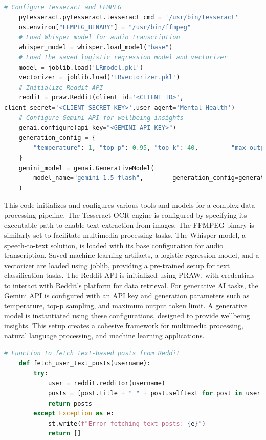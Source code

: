 \begin{tcolorbox}[colback=gray!5!white, colframe=gray!80!black, boxrule=0.5pt, title=Configuration and Model Initialization]
    \begin{lstlisting}[language=Python]
    # Configure Tesseract and FFMPEG
    pytesseract.pytesseract.tesseract_cmd = '/usr/bin/tesseract'
    os.environ["FFMPEG_BINARY"] = "/usr/bin/ffmpeg"
    # Load Whisper model for audio transcription
    whisper_model = whisper.load_model("base")
    # Load the saved logistic regression model and vectorizer
    model = joblib.load('LRmodel.pkl')
    vectorizer = joblib.load('LRvectorizer.pkl')
    # Initialize Reddit API
    reddit = praw.Reddit(client_id='<CLIENT_ID>',
client_secret='<CLIENT_SECRET_KEY>',user_agent='Mental Health')
    # Configure Gemini API for wellbeing insights
    genai.configure(api_key="<GEMINI_API_KEY>")
    generation_config = {
        "temperature": 1, "top_p": 0.95, "top_k": 40,         "max_output_tokens": 8192, "response_mime_type": "text/plain",
    }
    gemini_model = genai.GenerativeModel(
        model_name="gemini-1.5-flash",        generation_config=generation_config,
    )
    \end{lstlisting}
\end{tcolorbox}

\noindent
This code initializes and configures various tools and models for a complex data-processing pipeline. The Tesseract OCR engine is configured by specifying its executable path to enable text extraction from images. The FFMPEG binary is similarly set to facilitate multimedia processing tasks. The Whisper model, a speech-to-text solution, is loaded with its base configuration for audio transcription. Saved machine learning artifacts, a logistic regression model, and a vectorizer are loaded using joblib, providing a pre-trained setup for text classification tasks. The Reddit API is initialized using PRAW, with credentials to interact with Reddit's platform for data retrieval. For generative AI tasks, the Gemini API is configured with an API key and generation parameters such as temperature, top-p sampling, and maximum output token limit. A generative model is instantiated using these configurations, designed to provide wellbeing insights. This setup creates a cohesive framework for multimedia processing, natural language processing, and machine learning applications.


\begin{tcolorbox}[colback=gray!5!white, colframe=gray!80!black, boxrule=0.5pt, title=Fetching Reddit User Text Posts]
    \begin{lstlisting}[language=Python]
    # Function to fetch text-based posts from Reddit
    def fetch_user_text_posts(username):
        try:
            user = reddit.redditor(username)
            posts = [post.title + " " + post.selftext for post in user.submissions.new(limit=20)]
            return posts
        except Exception as e:
            st.write(f"Error fetching text posts: {e}")
            return []
    \end{lstlisting}
\end{tcolorbox}

